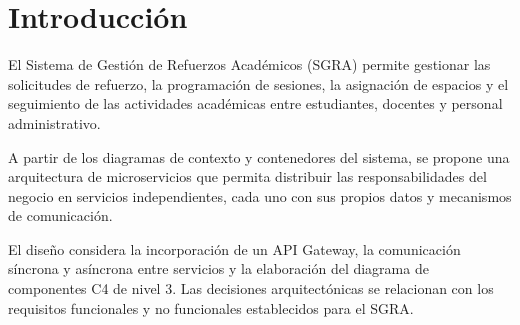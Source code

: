 \section{Introducción}

El Sistema de Gestión de Refuerzos Académicos (SGRA)
permite gestionar las solicitudes de refuerzo, la programación
de sesiones, la asignación de espacios y el seguimiento
de las actividades académicas entre estudiantes, docentes
y personal administrativo.

A partir de los diagramas de contexto y contenedores
del sistema, se propone una arquitectura de microservicios
que permita distribuir las responsabilidades del negocio
en servicios independientes, cada uno con sus propios datos
y mecanismos de comunicación.

El diseño considera la incorporación de un API Gateway,
la comunicación síncrona y asíncrona entre servicios y
la elaboración del diagrama de componentes C4 de nivel 3.
Las decisiones arquitectónicas se relacionan con los
requisitos funcionales y no funcionales establecidos
para el SGRA.
